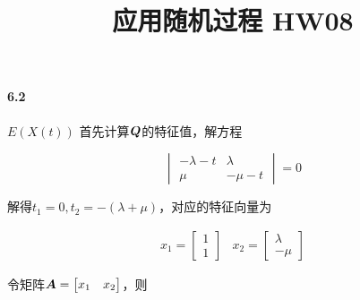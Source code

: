 \documentclass{../notes}
\title{应用随机过程 HW08}
\begin{document}
    \maketitle

    \paragraph*{6.2}

    \begin{subquestions}
        \item[$E(X(t))$] 首先计算$\boldsymbol Q$的特征值，解方程

        \begin{equation}
            \begin{vmatrix}
                -\lambda - t & \lambda \\
                \mu & -\mu - t
            \end{vmatrix} = 0
        \end{equation}

        解得$t_1 = 0, t_2 = -(\lambda + \mu)$，对应的特征向量为

        \begin{equation}
            \begin{aligned}
                x_1 = \begin{bmatrix}
                    1 \\ 1
                \end{bmatrix} &
                x_2 = \begin{bmatrix}
                    \lambda \\ -\mu
                \end{bmatrix}
            \end{aligned}
        \end{equation}

        令矩阵$\boldsymbol A = \begin{bmatrix} x_1 & x_2 \end{bmatrix}$，则


\end{subquestions}
\end{document}

